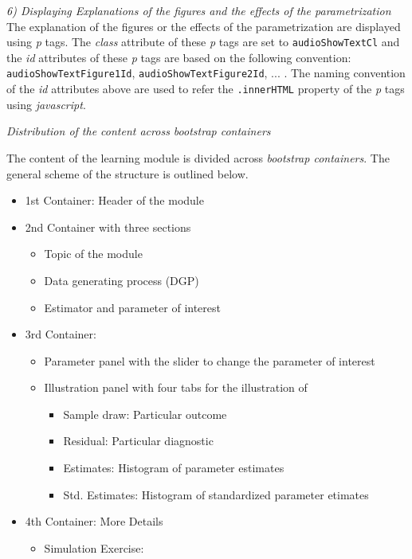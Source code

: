 \documentclass[12pt]{article}
\begin{document}

\vspace{1em}
\noindent\emph{6) Displaying Explanations of the figures and the effects of the parametrization}
%
The explanation of the figures or the effects of the parametrization are displayed using \emph{p} tags. 
%
The \emph{class} attribute of these \emph{p} tags are set to \texttt{audioShowTextCl} and the \emph{id} attributes of these \emph{p} tags are based on the following convention: \texttt{audioShowTextFigure1Id}, \texttt{audioShowTextFigure2Id}, ... . 
%
The naming convention of the \emph{id} attributes above are used to refer the \texttt{.innerHTML} property of the \emph{p} tags using \emph{javascript}. 


\vspace{1em}
\noindent\emph{Distribution of the content across bootstrap containers}

The content of the learning module is divided across \emph{bootstrap containers}. 
%
The general scheme of the structure is outlined below. 

\begin{itemize}
	\item 1st Container: Header of the module
	\item 2nd Container with three sections
	\begin{itemize}
		\item Topic of the module
		\item Data generating process (DGP)
		\item Estimator and parameter of interest
	\end{itemize}
	\item 3rd Container:
	\begin{itemize}
		\item Parameter panel with the slider to change the parameter of interest
		\item Illustration panel with four tabs for the illustration of
		\begin{itemize}
			\item Sample draw: Particular outcome
			\item Residual: Particular diagnostic
			\item Estimates: Histogram of parameter estimates
			\item Std. Estimates: Histogram of standardized parameter etimates
		\end{itemize}
	\end{itemize}
	\item 4th Container: More Details
	\begin{itemize}
		\item Simulation Exercise: 
	\end{itemize}
	
\end{itemize}
\end{document}
